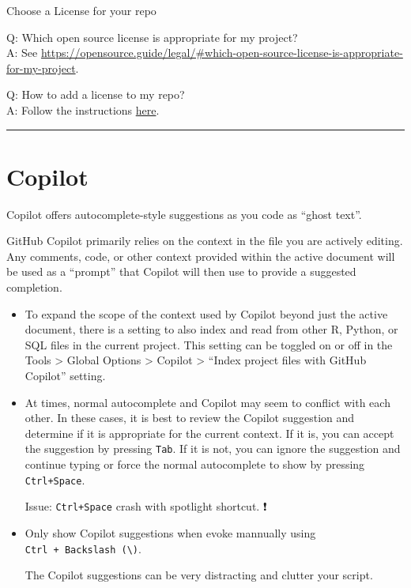 \documentclass[
  a4paper,
  twoside,
  openright]{book}
\theoremstyle{definition}
\theoremstyle{definition}
\theoremstyle{definition}
\theoremstyle{definition}
\theoremstyle{remark}
\begin{document}
Choose a License for your repo

Q: Which open source license is appropriate for my project?\\
A: See \url{https://opensource.guide/legal/\#which-open-source-license-is-appropriate-for-my-project}.

Q: How to add a license to my repo?\\
A: Follow the instructions \href{https://docs.github.com/en/communities/setting-up-your-project-for-healthy-contributions/adding-a-license-to-a-repository}{here}.

\begin{center}\rule{0.5\linewidth}{0.5pt}\end{center}

\section{Copilot}\label{copilot}

Copilot offers autocomplete-style suggestions as you code as ``ghost text''.

GitHub Copilot primarily relies on the context in the file you are actively editing. Any comments, code, or other context provided within the active document will be used as a ``prompt'' that Copilot will then use to provide a suggested completion.

\begin{itemize}
\item
  To expand the scope of the context used by Copilot beyond just the active document, there is a setting to also index and read from other R, Python, or SQL files in the current project. This setting can be toggled on or off in the Tools \textgreater{} Global Options \textgreater{} Copilot \textgreater{} ``Index project files with GitHub Copilot'' setting.
\item
  At times, normal autocomplete and Copilot may seem to conflict with each other. In these cases, it is best to review the Copilot suggestion and determine if it is appropriate for the current context. If it is, you can accept the suggestion by pressing \texttt{Tab}. If it is not, you can ignore the suggestion and continue typing or force the normal autocomplete to show by pressing \texttt{Ctrl+Space}.

  Issue: \texttt{Ctrl+Space} crash with spotlight shortcut. ❗️
\item
  Only show Copilot suggestions when evoke mannually using \texttt{Ctrl\ +\ Backslash\ (\textbackslash{})}.

  The Copilot suggestions can be very distracting and clutter your script.
\end{itemize}
\end{document}
